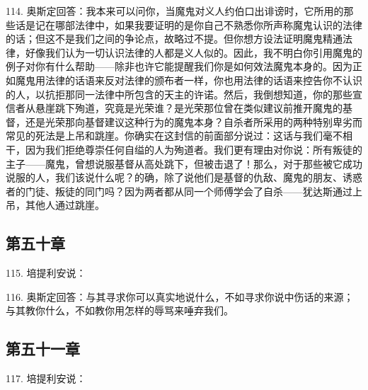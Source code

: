 114. 奥斯定回答：我本来可以问你，当魔鬼对义人约伯口出诽谤时，它所用的那些话是记在哪部法律中，如果我要证明的是你自己不熟悉你所声称魔鬼认识的法律的话；但这不是我们之间的争论点，故略过不提。但你想方设法证明魔鬼精通法律，好像我们认为一切认识法律的人都是义人似的。因此，我不明白你引用魔鬼的例子对你有什么帮助——除非也许它能提醒我们你是如何效法魔鬼本身的。因为正如魔鬼用法律的话语来反对法律的颁布者一样，你也用法律的话语来控告你不认识的人，以抗拒那同一法律中所包含的天主的许诺。然后，我倒想知道，你的那些宣信者从悬崖跳下殉道，究竟是光荣谁？是光荣那位曾在类似建议前推开魔鬼的基督，还是光荣那向基督建议这种行为的魔鬼本身？自杀者所采用的两种特别卑劣而常见的死法是上吊和跳崖。你确实在这封信的前面部分说过：这话与我们毫不相干，因为我们拒绝尊崇任何自缢的人为殉道者。我们更有理由对你说：所有叛徒的主子——魔鬼，曾想说服基督从高处跳下，但被击退了！那么，对于那些被它成功说服的人，我们该说什么呢？的确，除了说他们是基督的仇敌、魔鬼的朋友、诱惑者的门徒、叛徒的同门吗？因为两者都从同一个师傅学会了自杀——犹达斯通过上吊，其他人通过跳崖。\par


\subsection{第五十章}

115. 培提利安说：\par

116. 奥斯定回答：与其寻求你可以真实地说什么，不如寻求你说中伤话的来源；与其教你什么，不如教你用怎样的辱骂来唾弃我们。\par


\subsection{第五十一章}

117. 培提利安说：\par

